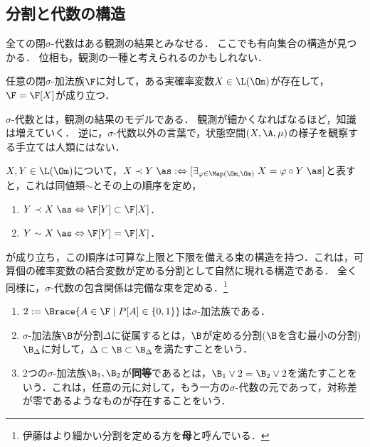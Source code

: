 \documentclass[uplatex,dvipdfmx]{jsreport}
\begin{document}
\subsection{分割と代数の構造}

\begin{tcolorbox}[colframe=ForestGreen, colback=ForestGreen!10!white,breakable,colbacktitle=ForestGreen!40!white,coltitle=black,fonttitle=\bfseries\sffamily,
title=]
    全ての閉$\sigma$-代数はある観測の結果とみなせる．
    ここでも有向集合の構造が見つかる．
    位相も，観測の一種と考えられるのかもしれない．
\end{tcolorbox}

\begin{theorem}
    任意の閉$\sigma$-加法族$\F$に対して，ある実確率変数$X\in\L(\Om)$が存在して，$\F=\F[X]$が成り立つ．
\end{theorem}
\begin{remarks}
    $\sigma$-代数とは，観測の結果のモデルである．
    観測が細かくなればなるほど，知識は増えていく．
    逆に，$\sigma$-代数以外の言葉で，状態空間$(X,\A,\mu)$の様子を観察する手立ては人類にはない．
\end{remarks}

\begin{theorem}[確率変数が定める分割]
    $X,Y\in\L(\Om)$について，$X\prec Y\;\as:\Leftrightarrow [\exists_{\varphi\in\Map(\Om,\Om)}\;X=\varphi\circ Y\;\as]$と表すと，これは同値類$\sim$とその上の順序を定め，
    \begin{enumerate}
        \item $Y\prec X\;\as\Leftrightarrow\F[Y]\subset\F[X]$．
        \item $Y\sim X\;\as\Leftrightarrow\F[Y]=\F[X]$．
    \end{enumerate}
    が成り立ち，この順序は可算な上限と下限を備える束の構造を持つ．これは，可算個の確率変数の結合変数が定める分割として自然に現れる構造である．
    全く同様に，$\sigma$-代数の包含関係は完備な束を定める．\footnote{伊藤\cite{伊藤清}はより細かい分割を定める方を\textbf{母}と呼んでいる．}
\end{theorem}

\begin{definition}\mbox{}
    \begin{enumerate}
        \item $2:=\Brace{A\in\F\mid P[A]\in\{0,1\}}$は$\sigma$-加法族である．
        \item $\sigma$-加法族$\B$が分割$\Delta$に従属するとは，$\B$が定める分割($\B$を含む最小の分割)$\B_\Delta$に対して，$\Delta\subset\B\subset\B_\Delta$を満たすことをいう．
        \item 2つの$\sigma$-加法族$\B_1,\B_2$が\textbf{同等}であるとは，$\B_1\lor2=\B_2\lor2$を満たすことをいう．これは，任意の元に対して，もう一方の$\sigma$-代数の元であって，対称差が零であるようなものが存在することをいう．
    \end{enumerate}
\end{definition}
\end{document}
